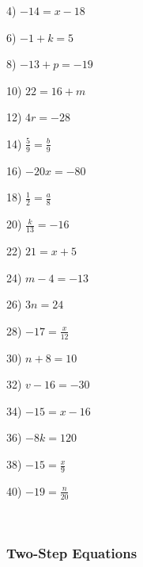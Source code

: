 \begin{multicols}{2}
  4) $- 14 = x - 18$
  
  6) $- 1 + k = 5$
  
  8) $- 13 + p = - 19$
  
  10) $22 = 16 + m$
  
  12) $4 r = - 28$
  
  14) $\frac{5}{9} = \frac{b}{9}$
  
  16) $- 20 x = - 80$
  
  18) $\frac{1}{2} = \frac{a}{8}$
  
  20) $\frac{k}{13} = - 16$
  
  22) $21 = x + 5$
  
  24) $m - 4 = - 13$
  
  26) $3 n = 24$
  
  28) $- 17 = \frac{x}{12}$
  
  30) $n + 8 = 10$
  
  32) $v - 16 = - 30$
  
  34) $- 15 = x - 16$
  
  36) $- 8 k = 120$
  
  38) $- 15 = \frac{x}{9}$
  
  40) $- 19 = \frac{n}{20}$
\end{multicols}

\vspace{2in}
~

\pagebreak

\subsubsection{Two-Step Equations}\par


{}

